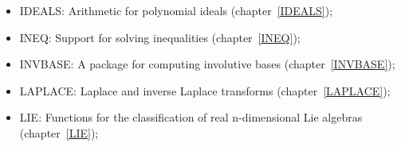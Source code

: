 \begin{itemize}
\item
{IDEALS: Arithmetic for polynomial ideals} (chapter~\ref{IDEALS});

\item
{INEQ: Support for solving inequalities} (chapter~\ref{INEQ});

\item
{INVBASE: A package for computing involutive bases}
(chapter~\ref{INVBASE}); 

\item
{LAPLACE: Laplace and inverse Laplace transforms}
(chapter~\ref{LAPLACE}); 

\item
{LIE: Functions for the classification of real n-dimensional Lie
algebras} (chapter~\ref{LIE});


\end{itemize}
